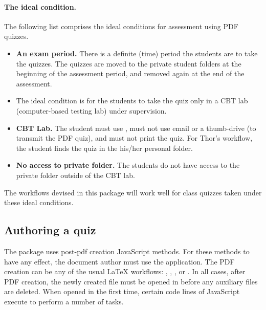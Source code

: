 \documentclass{article}
\def\FmtMP#1{\marginpar{\small\itshape\raggedleft#1}}
\begin{document}
\paragraph*{The ideal condition.} The following list comprises the ideal conditions
for assessment using PDF quizzes.
\begin{itemize}
  \item \textbf{An exam period.} There is a definite (time) period the
      students are to take the quizzes. The quizzes are moved to the
      private student folders at the beginning of the assessment period,
      and removed again at the end of the assessment.
  \item  The ideal condition is for the students to take the quiz only in a
      CBT lab (computer-based testing lab) under supervision.

  \item \textbf{CBT Lab.} The student must use , must not
      use email or a thumb-drive (to transmit the PDF quiz), and must not
      print the quiz. For Thor's workflow, the student finds the quiz in
      the his/her personal folder.

  \item \textbf{No access to private folder.} The students do not have access to the private folder outside of
      the CBT lab.
\end{itemize}
The workflows devised in this package will work well for class quizzes taken under these ideal conditions.

\subsection{Authoring a quiz}

The  package uses post-pdf creation JavaScript methods. For
these methods to have any effect, the document author must use the \FmtMP{\app{Acrobat} required} application. The PDF creation can be
any of the usual {\LaTeX} workflows: ,
, , or . In all cases, after PDF
creation, the newly created file must be opened in  before any
auxiliary files are deleted. When opened in  the first time,
certain code lines of JavaScript execute to perform a number of tasks.
\end{document}
